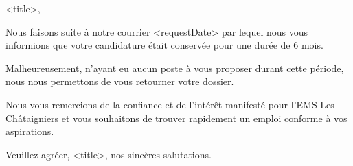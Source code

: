 
<title>,

Nous faisons suite à notre courrier <requestDate> par lequel nous vous informions que votre candidature était conservée pour une durée de 6 mois.

Malheureusement, n’ayant eu aucun poste à vous proposer durant cette période, nous nous permettons de vous retourner votre dossier. 

Nous vous remercions de la confiance et de l’intérêt manifesté pour l’EMS Les Châtaigniers et vous souhaitons de trouver rapidement un emploi conforme à vos aspirations.

Veuillez agréer, <title>, nos sincères salutations.



